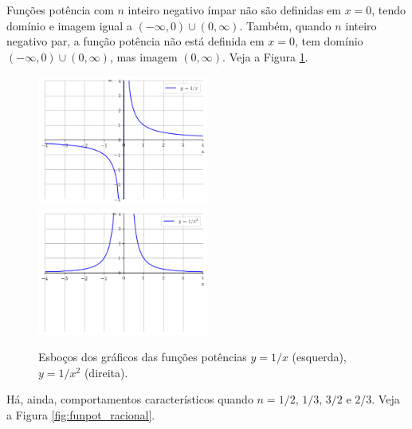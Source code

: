 Funções potência com $n$ inteiro negativo ímpar não são definidas em $x=0$, tendo domínio e imagem igual a $(-\infty, 0)\cup (0, \infty)$. Também, quando $n$ inteiro negativo par, a função potência não está definida em $x=0$, tem domínio $(-\infty, 0)\cup (0, \infty)$, mas imagem $(0, \infty)$. Veja a Figura \ref{fig:funpot_negativo}.

\begin{figure}[H]
  \centering
  \includegraphics[width=0.5\textwidth]{./cap_funcao/dados/fig_funpot_negativo/fig_funpot_negativo_impar}~
    \includegraphics[width=0.5\textwidth]{./cap_funcao/dados/fig_funpot_negativo/fig_funpot_negativo_par}
  \caption{Esboços dos gráficos das funções potências $y=1/x$ (esquerda), $y=1/x^2$ (direita).}
  \label{fig:funpot_negativo}
\end{figure}

Há, ainda, comportamentos característicos quando $n=1/2$, $1/3$, $3/2$ e $2/3$. Veja a Figura \ref{fig:funpot_racional}.

